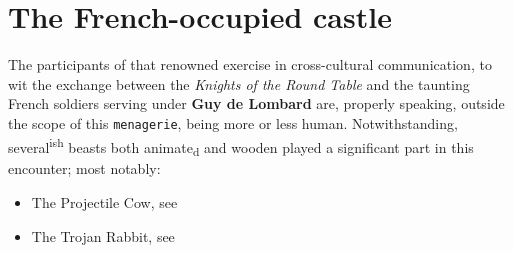 \documentclass{metanorma}
\begin{document}

\section{The French-occupied castle}


The participants of that renowned exercise in cross-cultural
communication, to wit the exchange between the
\textit{Knights of the Round Table}
and the taunting French soldiers serving under 
\textbf{Guy de Lombard} are,
properly speaking, outside the scope of this \texttt{menagerie}, being more
or less human. Notwithstanding, several\textsuperscript{ish} beasts both animate\textsubscript{d}
and wooden played a significant part in this encounter; most
notably:

\begin{itemize}
  \item The Projectile Cow, see 
  \item The Trojan Rabbit, see 
\end{itemize}

\end{document}
